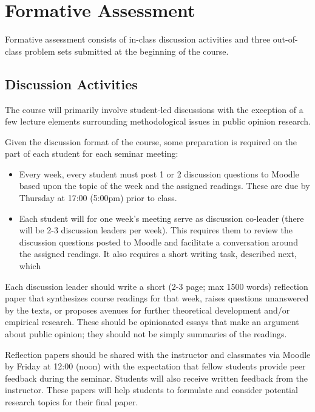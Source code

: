 \documentclass[12pt,a4paper]{article}
\begin{document}
\section{Formative Assessment}

Formative assessment consists of in-class discussion activities and three out-of-class problem sets submitted at the beginning of the course.

\subsection{Discussion Activities}

The course will primarily involve student-led discussions with the exception of a few lecture elements surrounding methodological issues in public opinion research.

Given the discussion format of the course, some preparation is required on the part of each student for each seminar meeting:

\begin{itemize}
\item Every week, every student must post 1 or 2 discussion questions to Moodle based upon the topic of the week and the assigned readings. These are due by Thursday at 17:00 (5:00pm) prior to class.
\item Each student will for one week's meeting serve as discussion co-leader (there will be 2-3 discussion leaders per week). This requires them to review the discussion questions posted to Moodle and facilitate a conversation around the assigned readings. It also requires a short writing task, described next, which 
\end{itemize}

Each discussion leader should write a short (2-3 page; max 1500 words) reflection paper that synthesizes course readings for that week, raises questions unanswered by the texts, or proposes avenues for further theoretical development and/or empirical research. These should be opinionated essays that make an argument about public opinion; they should not be simply summaries of the readings.

Reflection papers should be shared with the instructor and classmates via Moodle by Friday at 12:00 (noon) with the expectation that fellow students provide peer feedback during the seminar. Students will also receive written feedback from the instructor. These papers will help students to formulate and consider potential research topics for their final paper.
\end{document}
